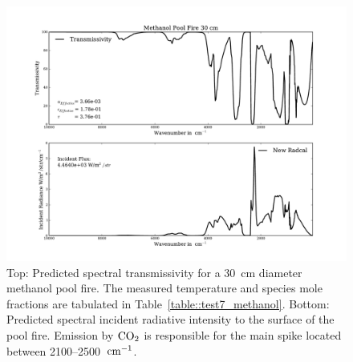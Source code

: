 \begin{figure}
\includegraphics[width=\textwidth]{Figures/Methanol_Pool_Fire_30cm.pdf}
\caption{Top: Predicted spectral transmissivity for a 30~cm diameter methanol pool fire. The measured temperature and species mole fractions are tabulated in Table~\ref{table::test7_methanol}. Bottom: Predicted spectral incident radiative intensity to the surface of the pool fire. Emission by $\rm CO_2$ is responsible for the main spike located between 2100--2500~$\rm cm^{-1}$.\label{fig:Test7_Methanol}}
\end{figure}

